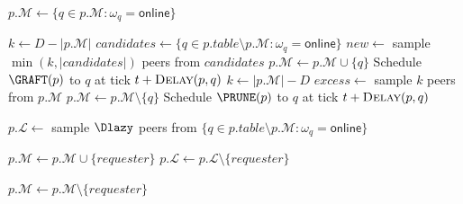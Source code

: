 \documentclass{article}
\begin{document}
\begin{algorithm}[H]
\caption{Mesh Maintenance (\GRAFT / \PRUNE)}
\label{alg:mesh}
\begin{algorithmic}[1]
    \State $p.\mathcal{M} \gets \{q \in p.\mathcal{M} : \omega_q = \mathsf{online}\}$ 
    
     
        \State $k \gets D - |p.\mathcal{M}|$
        \State $\mathit{candidates} \gets \{q \in p.\mathit{table} \setminus p.\mathcal{M} : \omega_q = \mathsf{online}\}$
        \State $\mathit{new} \gets$ sample $\min(k, |\mathit{candidates}|)$ peers from $\mathit{candidates}$
            \State $p.\mathcal{M} \gets p.\mathcal{M} \cup \{q\}$
            \State Schedule $\GRAFT(p)$ to $q$ at tick $t + \Call{Delay}{p, q}$
        \EndFor
     
        \State $k \gets |p.\mathcal{M}| - D$
        \State $\mathit{excess} \gets$ sample $k$ peers from $p.\mathcal{M}$
            \State $p.\mathcal{M} \gets p.\mathcal{M} \setminus \{q\}$
            \State Schedule $\PRUNE(p)$ to $q$ at tick $t + \Call{Delay}{p, q}$
        \EndFor
    \EndIf
    
    \State {}
    \State $p.\mathcal{L} \gets$ sample $\Dlazy$ peers from $\{q \in p.\mathit{table} \setminus p.\mathcal{M} : \omega_q = \mathsf{online}\}$
\EndFor
\EndProcedure
\end{algorithmic}
\end{algorithm}


\begin{algorithm}[H]
\caption{Process \GRAFT / \PRUNE}
\label{alg:graft-prune}
\begin{algorithmic}[1]
        \State $p.\mathcal{M} \gets p.\mathcal{M} \cup \{\mathit{requester}\}$
        \State $p.\mathcal{L} \gets p.\mathcal{L} \setminus \{\mathit{requester}\}$
    \EndIf
\EndProcedure

    \State $p.\mathcal{M} \gets p.\mathcal{M} \setminus \{\mathit{requester}\}$
\EndProcedure
\end{algorithmic}
\end{algorithm}
\end{document}
